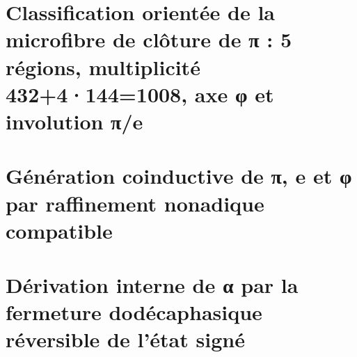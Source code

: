 


\chapter{Classification orientée de la microfibre de clôture de π : 5 régions, multiplicité 432+4·144=1008, axe φ et involution π/e}
\label{chap:sucesor-102-09}


\chapter{Génération coinductive de π, e et φ par raffinement nonadique compatible}
\label{chap:sucesor-102-10}




















\chapter{Dérivation interne de α par la fermeture dodécaphasique réversible de l'état signé}
\label{chap:sucesor-102-11}



















